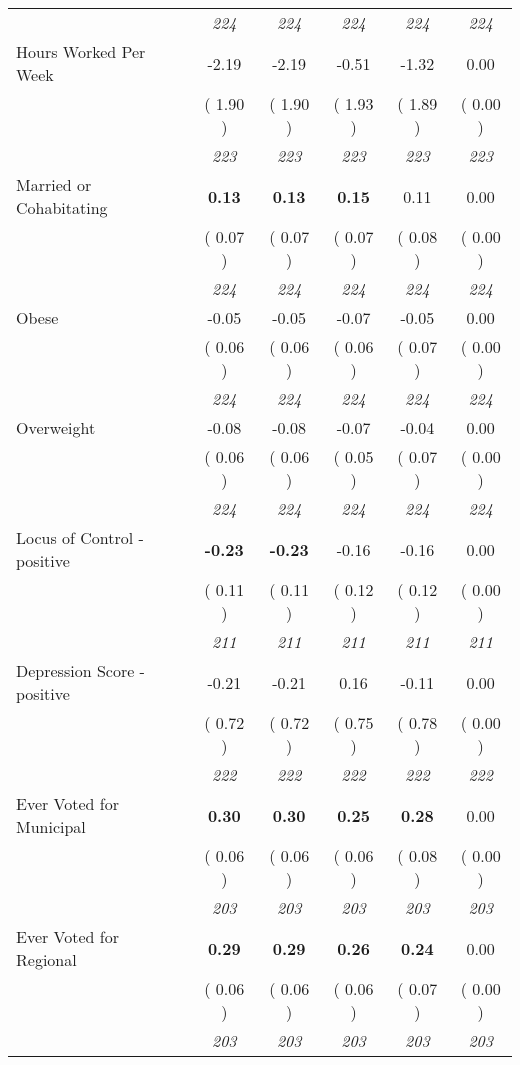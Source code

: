 \begin{tabular}{l c c c c c}
& \textit{ 224 } & \textit{ 224 } & \textit{ 224 } & \textit{ 224 } & \textit{ 224 } \\
Hours Worked Per Week &     -2.19 &     -2.19 &     -0.51 &     -1.32 &      0.00 \\
& (     1.90 ) & (     1.90 ) & (     1.93 ) & (     1.89 ) & (     0.00 ) \\
& \textit{ 223 } & \textit{ 223 } & \textit{ 223 } & \textit{ 223 } & \textit{ 223 } \\
Married or Cohabitating & \textbf{      0.13 } & \textbf{      0.13 } & \textbf{      0.15 } &      0.11 &      0.00 \\
& (     0.07 ) & (     0.07 ) & (     0.07 ) & (     0.08 ) & (     0.00 ) \\
& \textit{ 224 } & \textit{ 224 } & \textit{ 224 } & \textit{ 224 } & \textit{ 224 } \\
Obese &     -0.05 &     -0.05 &     -0.07 &     -0.05 &      0.00 \\
& (     0.06 ) & (     0.06 ) & (     0.06 ) & (     0.07 ) & (     0.00 ) \\
& \textit{ 224 } & \textit{ 224 } & \textit{ 224 } & \textit{ 224 } & \textit{ 224 } \\
Overweight &     -0.08 &     -0.08 &     -0.07 &     -0.04 &      0.00 \\
& (     0.06 ) & (     0.06 ) & (     0.05 ) & (     0.07 ) & (     0.00 ) \\
& \textit{ 224 } & \textit{ 224 } & \textit{ 224 } & \textit{ 224 } & \textit{ 224 } \\
Locus of Control - positive & \textbf{     -0.23 } & \textbf{     -0.23 } &     -0.16 &     -0.16 &      0.00 \\
& (     0.11 ) & (     0.11 ) & (     0.12 ) & (     0.12 ) & (     0.00 ) \\
& \textit{ 211 } & \textit{ 211 } & \textit{ 211 } & \textit{ 211 } & \textit{ 211 } \\
Depression Score - positive &     -0.21 &     -0.21 &      0.16 &     -0.11 &      0.00 \\
& (     0.72 ) & (     0.72 ) & (     0.75 ) & (     0.78 ) & (     0.00 ) \\
& \textit{ 222 } & \textit{ 222 } & \textit{ 222 } & \textit{ 222 } & \textit{ 222 } \\
Ever Voted for Municipal & \textbf{      0.30 } & \textbf{      0.30 } & \textbf{      0.25 } & \textbf{     0.28} &      0.00 \\
& (     0.06 ) & (     0.06 ) & (     0.06 ) & (     0.08 ) & (     0.00 ) \\
& \textit{ 203 } & \textit{ 203 } & \textit{ 203 } & \textit{ 203 } & \textit{ 203 } \\
Ever Voted for Regional & \textbf{      0.29 } & \textbf{      0.29 } & \textbf{      0.26 } & \textbf{     0.24} &      0.00 \\
& (     0.06 ) & (     0.06 ) & (     0.06 ) & (     0.07 ) & (     0.00 ) \\
& \textit{ 203 } & \textit{ 203 } & \textit{ 203 } & \textit{ 203 } & \textit{ 203 } \\
\bottomrule
\end{tabular}
